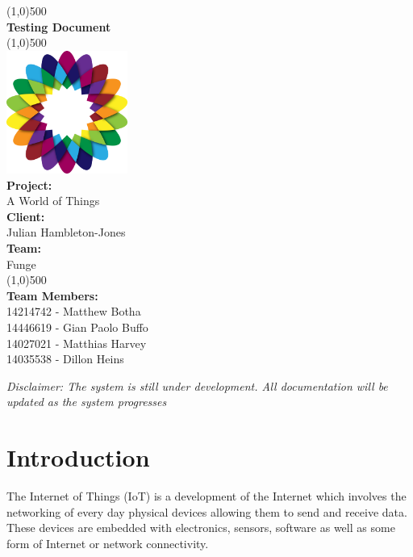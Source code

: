 \documentclass{article}
\begin{document}
\begin{titlepage}
	\begin{center}
		\line(1,0){500}\\
		[6mm]
		\huge{\bfseries Testing Document}\\
		\line(1,0){500}\\
		[5mm]
		\includegraphics[width=150px]{../images/AWorldOfPlants.png}
		\\
		[5mm]
		\large\textbf{Project:}\\A World of Things\\
		[3mm]
		\large\textbf{Client:}\\Julian Hambleton-Jones\\
		[3mm]
		\large \textbf{Team:}\\Funge\\
		\line(1,0){500}\\
		[5mm]
		\large \textbf{Team Members:}\\
		[3mm]
		\large 14214742 - Matthew Botha\\
		\large 14446619 - Gian Paolo Buffo\\
		\large 14027021 - Matthias Harvey\\
        \large 14035538 - Dillon Heins\\[3mm]
	\end{center}
\end{titlepage}

\cleardoublepage
\thispagestyle{empty}
\tableofcontents

\cleardoublepage
\setcounter{page}{1}

\textit{Disclaimer: The system is still under development. All documentation will be updated as the system progresses}

\section{Introduction}
	The Internet of Things (IoT) is a development of the Internet which involves the networking of every day physical devices allowing them to send and receive data. These devices are embedded with electronics, sensors, software as well as some form of Internet or network connectivity.
	
\end{document}
